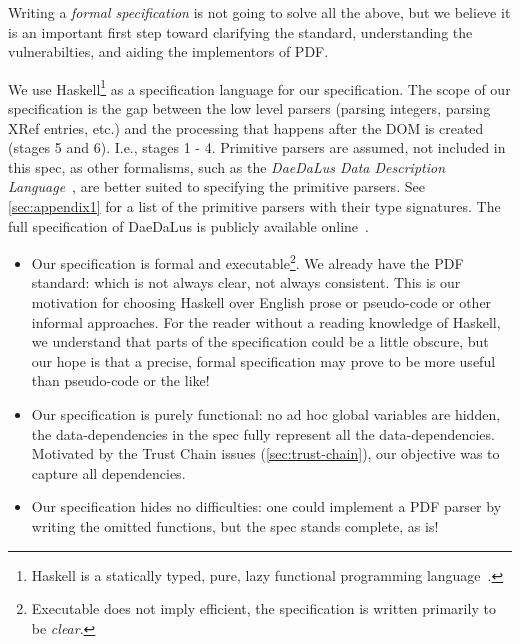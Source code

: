 Writing a \emph{formal specification} is not going to solve all the above,
but we believe it is an important first step toward clarifying the
standard, understanding the vulnerabilties, and aiding the
implementors of PDF.

We use Haskell\footnote{
Haskell is a statically typed, pure, lazy functional programming
language~\cite{jones2003haskell}.
}
as a specification language for our specification.
%
The scope of our specification is the gap between the low level
parsers (parsing integers, parsing XRef entries, etc.) and the
processing that happens after the DOM is created (stages 5 and 6).
%
I.e., stages 1 - 4.
%
Primitive parsers are assumed, not included in this spec, as other
formalisms, such as the \emph{DaeDaLus Data Description
  Language}~\cite{daedalusrepo}, are better suited to specifying the
primitive parsers.
%
See \cref{sec:appendix1} for a list of the primitive parsers
with their type signatures.
%
The full specification of DaeDaLus is publicly available
online~\cite{daedalusrepo}.

\begin{itemize}
\item Our specification is formal and executable\footnote{
  Executable does not imply efficient, the specification is written
  primarily to be \emph{clear}.}.
  We already have the PDF standard: which is not always clear, not always
  consistent. 
  This is our motivation for choosing Haskell over English prose or
  pseudo-code or other informal approaches.
  For the reader
  without a reading knowledge of Haskell, we understand that parts of
  the specification could be a little obscure, but our hope is that a
  precise, formal specification may prove to be more useful than
  pseudo-code or the like!
  
\item Our specification is purely functional: no ad hoc global variables are
  hidden, the data-dependencies in the spec fully represent all the
  data-dependencies.  Motivated by the Trust Chain issues
  (\cref{sec:trust-chain}), our objective was to capture all dependencies.
  
\item Our specification hides no difficulties: one could implement a PDF parser
  by writing the omitted functions, but the spec stands complete, as
  is!
\end{itemize}

